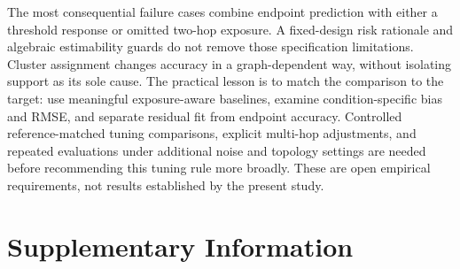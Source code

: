 \documentclass{article}
\begin{document}
The most consequential failure cases combine endpoint prediction with either a threshold response or omitted two-hop exposure. A fixed-design risk rationale and algebraic estimability guards do not remove those specification limitations. Cluster assignment changes accuracy in a graph-dependent way, without isolating support as its sole cause. The practical lesson is to match the comparison to the target: use meaningful exposure-aware baselines, examine condition-specific bias and RMSE, and separate residual fit from endpoint accuracy. Controlled reference-matched tuning comparisons, explicit multi-hop adjustments, and repeated evaluations under additional noise and topology settings are needed before recommending this tuning rule more broadly. These are open empirical requirements, not results established by the present study.

\clearpage


\clearpage
\appendix
\section{Supplementary Information}
\end{document}

